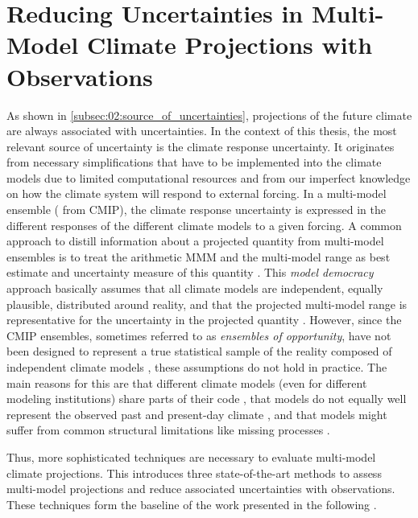 \section{Reducing Uncertainties in Multi-Model Climate Projections
  with Observations}
\label{sec:02:reducing_uncertainties}

As shown in \cref{subsec:02:source_of_uncertainties}, projections of the future
climate are always associated with uncertainties. In the context of this
thesis, the most relevant source of uncertainty is the climate response
uncertainty. It originates from necessary simplifications that have to be
implemented into the climate models due to limited computational resources and
from our imperfect knowledge on how the climate system will respond to external
forcing. In a multi-model ensemble (\eg{} from \ac{CMIP}), the climate response
uncertainty is expressed in the different responses of the different climate
models to a given forcing. A common approach to distill information about a
projected quantity from multi-model ensembles is to treat the arithmetic
\ac{MMM} and the multi-model range as best estimate and uncertainty measure of
this quantity \autocite{Collins2013}. This \emph{model democracy} approach
basically assumes that all climate models are independent, equally plausible,
distributed around reality, and that the projected multi-model range is
representative for the uncertainty in the projected quantity
\autocite{Knutti2017a}. However, since the \ac{CMIP} ensembles, sometimes
referred to as \emph{ensembles of opportunity}, have not been designed to
represent a true statistical sample of the reality composed of independent
climate models \autocite{Tebaldi2007}, these assumptions do not hold in
practice. The main reasons for this are that different climate models (even for
different modeling institutions) share parts of their code
\autocite{Abramowitz2019, Knutti2013}, that models do not equally well
represent the observed past and present-day climate \autocite{Gleckler2008,
  Knutti2013}, and that models might suffer from common structural limitations
like missing processes \autocite{Knutti2017a}.

Thus, more sophisticated techniques are necessary to evaluate multi-model
climate projections. This  introduces
three state-of-the-art methods to assess multi-model projections and reduce
associated uncertainties with observations. These techniques form the baseline
of the work presented in the following .


